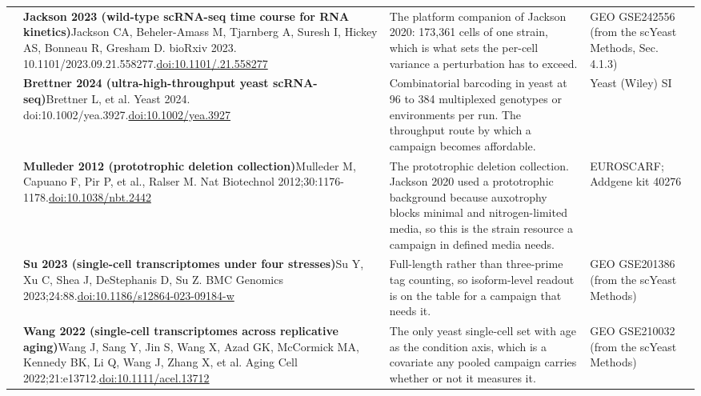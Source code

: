 \begin{landscape}
\begin{longtable}{@{}r@{\hspace{4pt}} L{86mm} L{92mm} L{62mm}@{}}
 & \textbf{Jackson 2023 (wild-type scRNA-seq time course for RNA kinetics)}\newline Jackson CA, Beheler-Amass M, Tjarnberg A, Suresh I, Hickey AS, Bonneau R, Gresham D. bioRxiv 2023. 10.1101/2023.09.21.558277.\newline \href{https://doi.org/10.1101/2023.09.21.558277}{doi:10.1101/.21.558277} & The platform companion of Jackson 2020: 173,361 cells of one strain, which is what sets the per-cell variance a perturbation has to exceed. & GEO GSE242556 (from the scYeast Methods, Sec. 4.1.3) \\
 & \textbf{Brettner 2024 (ultra-high-throughput yeast scRNA-seq)}\newline Brettner L, et al. Yeast 2024. doi:10.1002/yea.3927.\newline \href{https://doi.org/10.1002/yea.3927}{doi:10.1002/\allowbreak yea.3927} & Combinatorial barcoding in yeast at 96 to 384 multiplexed genotypes or environments per run. The throughput route by which a campaign becomes affordable. & Yeast (Wiley) SI \\
 & \textbf{Mulleder 2012 (prototrophic deletion collection)}\newline Mulleder M, Capuano F, Pir P, et al., Ralser M. Nat Biotechnol 2012;30:1176-1178.\newline \href{https://doi.org/10.1038/nbt.2442}{doi:10.1038/\allowbreak nbt.2442} & The prototrophic deletion collection. Jackson 2020 used a prototrophic background because auxotrophy blocks minimal and nitrogen-limited media, so this is the strain resource a campaign in defined media needs. & EUROSCARF; Addgene kit 40276 \\
 & \textbf{Su 2023 (single-cell transcriptomes under four stresses)}\newline Su Y, Xu C, Shea J, DeStephanis D, Su Z. BMC Genomics 2023;24:88.\newline \href{https://doi.org/10.1186/s12864-023-09184-w}{doi:10.1186/\allowbreak s12864-023-09184-w} & Full-length rather than three-prime tag counting, so isoform-level readout is on the table for a campaign that needs it. & GEO GSE201386 (from the scYeast Methods) \\
 & \textbf{Wang 2022 (single-cell transcriptomes across replicative aging)}\newline Wang J, Sang Y, Jin S, Wang X, Azad GK, McCormick MA, Kennedy BK, Li Q, Wang J, Zhang X, et al. Aging Cell 2022;21:e13712.\newline \href{https://doi.org/10.1111/acel.13712}{doi:10.1111/\allowbreak acel.13712} & The only yeast single-cell set with age as the condition axis, which is a covariate any pooled campaign carries whether or not it measures it. & GEO GSE210032 (from the scYeast Methods) \\

\end{longtable}
\end{landscape}
